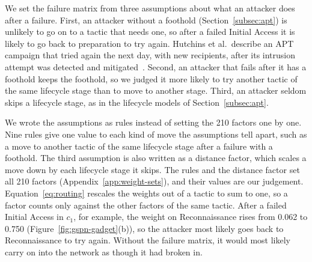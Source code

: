 \documentclass{cshonours}
\begin{document}
We set the failure matrix from three assumptions about what an attacker does
after a failure. First, an attacker without a foothold
(Section~\ref{subsec:apt}) is unlikely to go on to a tactic that needs one, so
after a failed Initial Access it is likely to go back to preparation to try
again. Hutchins et al.\ describe an APT campaign that tried again the next
day, with new recipients, after its intrusion attempt was detected and
mitigated~\citep{hutchins2011}. Second, an attacker that fails after it has a
foothold keeps the foothold, so we judged it more likely to try another
tactic of the same lifecycle stage than to move to another stage. Third, an
attacker seldom skips a lifecycle stage, as in the lifecycle models of
Section~\ref{subsec:apt}.

We wrote the assumptions as rules instead of setting the 210 factors one by
one. Nine rules give one value to each kind of move the assumptions tell
apart, such as a move to another tactic of the same lifecycle stage after a
failure with a foothold. The third assumption is also written as a distance
factor, which scales a move down by each lifecycle stage it skips. The rules
and the distance factor set all 210 factors (Appendix~\ref{app:weight-sets}),
and their values are our judgement. Equation~\ref{eq:routing} rescales
the weights out of a tactic to sum to one, so a factor counts only against
the other factors of the same tactic. After a failed Initial Access in
$c_1$, for example, the weight on Reconnaissance rises from 0.062 to 0.750
(Figure~\ref{fig:gspn-gadget}(b)), so the attacker most likely goes back to
Reconnaissance to try again. Without the failure matrix, it would most likely
carry on into the network as though it had broken in.
\end{document}
